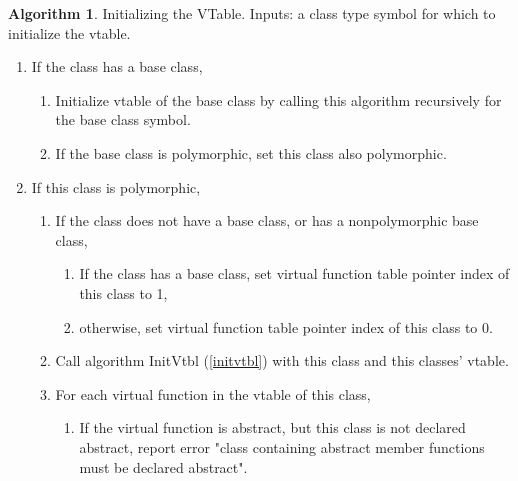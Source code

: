\documentclass[a4paper,oneside,11pt]{book}
\theoremstyle{definition}
\newtheorem{algo}{Algorithm}[section]
\begin{document}
\begin{algo}\label{initvtable} Initializing the VTable. Inputs: a class type symbol for which to initialize the vtable.
\begin{enumerate}
\item
If the class has a base class,
\begin{enumerate}
\item
Initialize vtable of the base class by calling this algorithm recursively for the base class symbol.
\item
If the base class is polymorphic, set this class also polymorphic.
\end{enumerate}
\item
If this class is polymorphic,
\begin{enumerate}
\item
If the class does not have a base class, or has a nonpolymorphic base class,
\begin{enumerate}
\item
If the class has a base class, set virtual function table pointer index of this class to 1,
\item
otherwise, set virtual function table pointer index of this class to 0.
\end{enumerate}
\item
Call algorithm InitVtbl (\ref{initvtbl}) with this class and this classes' vtable.
\item
For each virtual function in the vtable of this class,
\begin{enumerate}
\item
If the virtual function is abstract, but this class is not declared abstract, report error "class containing abstract member functions must be declared abstract".
\end{enumerate}
\end{enumerate}
\end{enumerate}
\end{algo}
\end{document}
